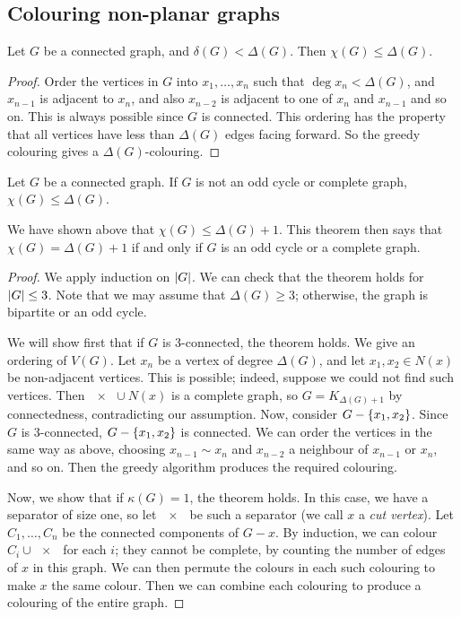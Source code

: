 \subsection{Colouring non-planar graphs}
\begin{proposition}
	Let \( G \) be a connected graph, and \( \delta(G) < \Delta(G) \).
	Then \( \chi(G) \leq \Delta(G) \).
\end{proposition}
\begin{proof}
	Order the vertices in \( G \) into \( x_1, \dots, x_n \) such that \( \deg x_n < \Delta(G) \), and \( x_{n-1} \) is adjacent to \( x_n \), and also \( x_{n-2} \) is adjacent to one of \( x_n \) and \( x_{n-1} \) and so on.
	This is always possible since \( G \) is connected.
	This ordering has the property that all vertices have less than \( \Delta(G) \) edges facing forward.
	So the greedy colouring gives a \( \Delta(G) \)-colouring.
\end{proof}
\begin{theorem}[Brooks]
	Let \( G \) be a connected graph.
	If \( G \) is not an odd cycle or complete graph, \( \chi(G) \leq \Delta(G) \).
\end{theorem}
\begin{remark}
	We have shown above that \( \chi(G) \leq \Delta(G) + 1 \).
	This theorem then says that \( \chi(G) = \Delta(G) + 1 \) if and only if \( G \) is an odd cycle or a complete graph.
\end{remark}
\begin{proof}
	We apply induction on \( \abs{G} \).
	We can check that the theorem holds for \( \abs{G} \leq 3 \).
	Note that we may assume that \( \Delta(G) \geq 3 \); otherwise, the graph is bipartite or an odd cycle.

	We will show first that if \( G \) is 3-connected, the theorem holds.
	We give an ordering of \( V(G) \).
	Let \( x_n \) be a vertex of degree \( \Delta(G) \), and let \( x_1, x_2 \in N(x) \) be non-adjacent vertices.
	This is possible; indeed, suppose we could not find such vertices.
	Then \( \qty{x} \cup N(x) \) is a complete graph, so \( G = K_{\Delta(G) + 1} \) by connectedness, contradicting our assumption.
	Now, consider \( G - \qty{x_1, x_2} \).
	Since \( G \) is 3-connected, \( G - \qty{x_1,x_2} \) is connected.
	We can order the vertices in the same way as above, choosing \( x_{n-1} \sim x_n \) and \( x_{n-2} \) a neighbour of \( x_{n-1} \) or \( x_n \), and so on.
	Then the greedy algorithm produces the required colouring.

	Now, we show that if \( \kappa(G) = 1 \), the theorem holds.
	In this case, we have a separator of size one, so let \( \qty{x} \) be such a separator (we call \( x \) a \emph{cut vertex}).
	Let \( C_1, \dots, C_n \) be the connected components of \( G - x \).
	By induction, we can colour \( C_i \cup \qty{x} \) for each \( i \); they cannot be complete, by counting the number of edges of \( x \) in this graph.
	We can then permute the colours in each such colouring to make \( x \) the same colour.
	Then we can combine each colouring to produce a colouring of the entire graph.
\end{proof}
